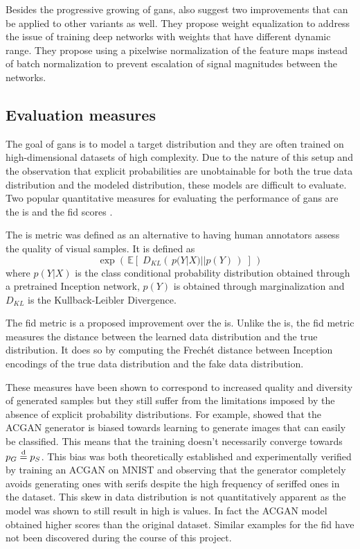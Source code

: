 Besides the progressive growing of \acrshort{gans}, \textcite{karras2017progressive} also suggest two improvements that can be applied to other variants as well. They propose weight equalization to address the issue of training deep networks with weights that have different dynamic range. They propose using a pixelwise normalization of the feature maps instead of batch normalization to prevent escalation of signal magnitudes between the networks.

\subsection{Evaluation measures}
The goal of \acrshort{gans} is to model a target distribution and they are often trained on high-dimensional datasets of high complexity. Due to the nature of this setup and the observation that explicit probabilities are unobtainable for both the true data distribution and the modeled distribution, these models are difficult to evaluate. Two popular quantitative measures for evaluating the performance of \acrshort{gans} are the \acrfull{is} \parencite{salimans2016improved} and the \acrfull{fid} scores \parencite{heuselRUNKH2017FID}.

The \acrlong{is} metric was defined as an alternative to having human annotators assess the quality of visual samples. It is defined as 
\begin{equation}
    \exp \left(\,\mathbb{E}\left[\;D_{KL}\left(\,p(Y|X) || p(Y)\,\right)\;\right]\,\right)
\end{equation}
where $p(Y|X)$ is the class conditional probability distribution obtained through a pretrained Inception network, $p(Y)$ is obtained through marginalization and $D_{KL}$ is the Kullback-Leibler Divergence.

The \acrlong{fid} metric is a proposed improvement over the \acrlong{is}. Unlike the \acrlong{is}, the \acrlong{fid} metric measures the distance between the learned data distribution and the true distribution. It does so by computing the Frechét distance between Inception encodings of the true data distribution and the fake data distribution.

These measures have been shown to correspond to increased quality and diversity of generated samples but they still suffer from the limitations imposed by the absence of explicit probability distributions. For example, \textcite{shuac2017acganisbad} showed that the ACGAN generator is biased towards learning to generate images that can easily be classified. This means that the training doesn't necessarily converge towards $p_G \stackrel{\text{d}}{=} p_S$. This bias was both theoretically established and experimentally verified by training an ACGAN on MNIST and observing that the generator completely avoids generating ones with serifs despite the high frequency of seriffed ones in the dataset. This skew in data distribution is not quantitatively apparent as the model was shown to still result in high \acrshort{is} values. In fact the ACGAN model obtained higher scores than the original dataset. Similar examples for the \acrshort{fid} have not been discovered during the course of this project. 

